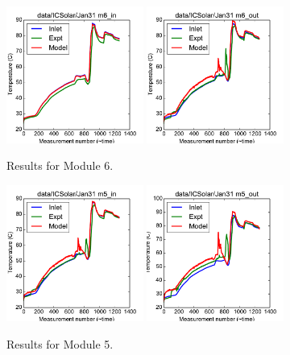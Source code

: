\documentclass{article}
\begin{document}
\begin{figure}[!ht]
\centering
\includegraphics[width=0.4\textwidth]{../../data/ICSolar/images/Jan31_m6_in.pdf}\hspace{0.05\textwidth}
\includegraphics[width=0.4\textwidth]{../../data/ICSolar/images/Jan31_m6_out.pdf}\hspace{0.05\textwidth}\\
\caption{Results for Module 6.}\end{figure}
\begin{figure}[!ht]
\centering
\includegraphics[width=0.4\textwidth]{../../data/ICSolar/images/Jan31_m5_in.pdf}\hspace{0.05\textwidth}
\includegraphics[width=0.4\textwidth]{../../data/ICSolar/images/Jan31_m5_out.pdf}\hspace{0.05\textwidth}\\
\caption{Results for Module 5.}\end{figure}
\end{document}
